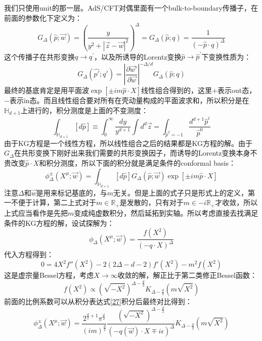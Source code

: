 我们只使用unit的那一层。AdS/CFT对偶里面有一个bulk-to-boundary传播子，在前面的参数化下定义为\cite{Witten:1998qj}：
\begin{equation}
	\boxed{
	G_\Delta(\hat{p};\vec{w})=\left(\frac{y}{y^2+|\vec{z}-\vec{w}|^2}\right)^\Delta =G_\Delta(\hat{p};q)=\frac{1}{(-\hat{p}\cdot q)^\Delta}
	}
\end{equation}
这个传播子在共形变换$q\to q^\prime$，以及所诱导的Lorentz变换$\hat p\to\hat p^\prime$下变换性质为：
\begin{equation}
	G_\Delta(\hat{p'};q')=\left|\frac{\partial\vec{w}'}{\partial\vec{w}}\right|^{-\Delta/d}G_\Delta(\hat{p};q)
\end{equation}
最终的基底肯定是用平面波$\exp\left[\pm im\hat{p}\cdot X\right]$线性组合得到的，这里$+$表示out态，$-$表示in态。而且线性组合要对所有在壳动量构成的平面波求和，所以积分是在$\mathbb{H}_{d+1}$上进行的，积分测度是上面的不变测度：
\begin{equation}
	\int_{\mathbb{H}_{d+1}}[d\hat{p}]\equiv\int_0^\infty\frac{dy}{y^{d+1}}\int d^d\vec{z}=\int_{\hat p^2=-1}\frac{d^{d+1}\hat{p}^i}{\hat{p}^0}
\end{equation}
由于KG方程是一个线性方程，所以线性组合之后的结果都是KG方程的解。由于$G_\Delta$在共形变换下刚好出来我们需要的共形变换因子，而诱导的Lorentz变换本身不贵改变$\hat p \cdot X$和积分测度，所以下面的积分就是满足条件的conformal basis：
\begin{equation}\label{27}
	\boxed{
	\phi_\Delta^\pm(X^\mu;\vec{w})=\int_{\mathbb{H}_{d+1}}[d\hat{p}]G_\Delta(\hat{p};\vec{w})\exp\left[\pm im\hat{p}\cdot X\right]
	}
\end{equation}
注意$\Delta$和$\vec{w}$是用来标记基底的，与$m$无关。但是上面的式子只是形式上的定义，第一不便于计算，第二上式对于$m\in\mathbb{R}_+$是发散的，只有对于$m\in-i{\mathbb{R}_+}$才收敛，所以上式应当看作是先把$m$变成纯虚数积分，然后延拓到实轴。所以考虑直接去找满足条件的KG方程的解，设试探解为：
\begin{equation}
	\phi_\Delta(X^\mu;\vec{w})=\frac{f(X^2)}{(-q\cdot X)^\Delta}
\end{equation}
代入方程得到：
\begin{equation}
	0=4X^2f''(X^2)-2(2\Delta-d-2)f'(X^2)-m^2f(X^2)
\end{equation}
这是虚宗量Bessel方程，考虑$X\to\infty$收敛的解，解正比于第二类修正Bessel函数：
\[f(X^2)\propto\left(\sqrt{-X^2}\right)^{\Delta-\frac{d}{2}}K_{\Delta-\frac{d}{2}}\left(m\sqrt{X^2}\right)\]
前面的比例系数可以从积分表达式\ref{27}积分后最终对比得到：
\begin{equation}
	\phi_\Delta^\pm(X^\mu;\vec{w})=\frac{2^{\frac d2+1}\pi^{\frac d2}}{(im)^{\frac d2}}\frac{(\sqrt{-X^2})^{\Delta-\frac d2}}{(-q(\vec{w})\cdot X\mp i\epsilon)^\Delta}K_{\Delta-\frac d2}(m\sqrt{X^2})
\end{equation}
